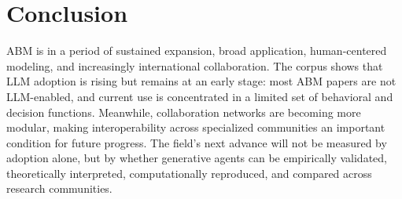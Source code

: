 \section{Conclusion}

ABM is in a period of sustained expansion, broad application, human-centered modeling, and increasingly international collaboration. The corpus shows that LLM adoption is rising but remains at an early stage: most ABM papers are not LLM-enabled, and current use is concentrated in a limited set of behavioral and decision functions. Meanwhile, collaboration networks are becoming more modular, making interoperability across specialized communities an important condition for future progress. The field’s next advance will not be measured by adoption alone, but by whether generative agents can be empirically validated, theoretically interpreted, computationally reproduced, and compared across research communities.